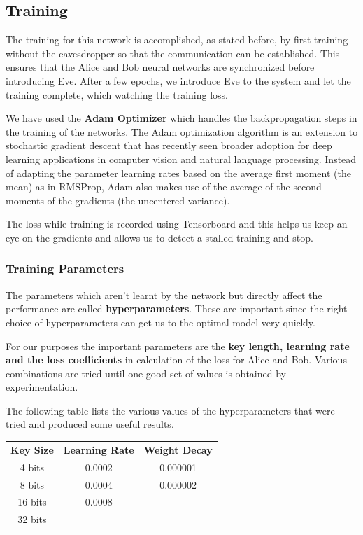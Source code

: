 \documentclass[a4paper]{article}
\begin{document}
    \subsection{Training}
    The training for this network is accomplished, as stated before, by first training without
    the eavesdropper so that the communication can be established. This ensures that the Alice and
    Bob neural networks are synchronized before introducing Eve. After a few epochs, we introduce
    Eve to the system and let the training complete, which watching the training loss.

    We have used the {\bfseries Adam Optimizer} which handles the backpropagation steps in the
    training of the networks. The Adam optimization algorithm is an extension to stochastic 
    gradient descent that has recently seen broader adoption for deep learning applications 
    in computer vision and natural language processing. Instead of adapting the parameter 
    learning rates based on the average first moment (the mean) as in RMSProp, Adam also 
    makes use of the average of the second moments of the gradients (the uncentered variance).

    The loss while training is recorded using Tensorboard and this helps us keep an eye on the
    gradients and allows us to detect a stalled training and stop.

      \subsubsection{Training Parameters}
      The parameters which aren't learnt by the network but directly affect the performance are
      called {\bfseries hyperparameters}. These are important since the right choice of hyperparameters
      can get us to the optimal model very quickly.

      For our purposes the important parameters are the {\bfseries key length, learning rate and the
      loss coefficients} in calculation of the loss for Alice and Bob. Various combinations are tried
      until one good set of values is obtained by experimentation.      

      The following table lists the various values of the hyperparameters that were tried and
      produced some useful results.

      \begin{center}
        \begin{tabular}{ c|c|c }
          \textbf{Key Size} & \textbf{Learning Rate} & \textbf{Weight Decay} \\
          4 bits            & 0.0002                 & 0.000001              \\
          8 bits            & 0.0004                 & 0.000002              \\
          16 bits           & 0.0008                 &                       \\
          32 bits           &                        &                       \\
        \end{tabular}
      \end{center}
\end{document}
